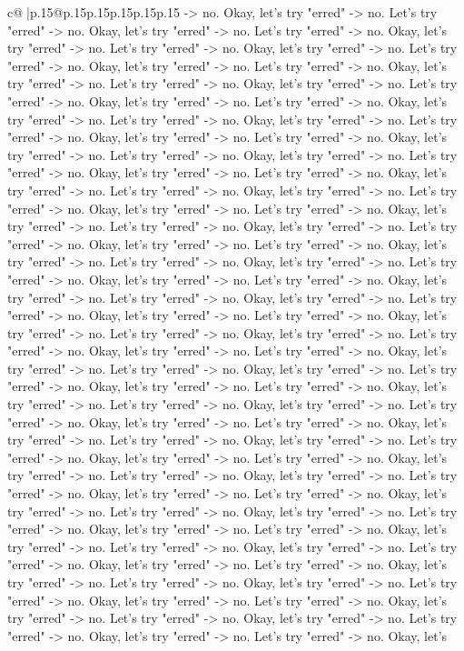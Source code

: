 \documentclass{article}
\begin{document}
{\begin{supertabular}{c@{$\;$}|p{.15\linewidth}@{}p{.15\linewidth}p{.15\linewidth}p{.15\linewidth}p{.15\linewidth}p{.15\linewidth}}
{{{{-}> no. Okay, let's try "erred" {-}> no. Let's try "erred" {-}> no. Okay, let's try "erred" {-}> no. Let's try "erred" {-}> no. Okay, let's try "erred" {-}> no. Let's try "erred" {-}> no. Okay, let's try "erred" {-}> no. Let's try "erred" {-}> no. Okay, let's try "erred" {-}> no. Let's try "erred" {-}> no. Okay, let's try "erred" {-}> no. Let's try "erred" {-}> no. Okay, let's try "erred" {-}> no. Let's try "erred" {-}> no. Okay, let's try "erred" {-}> no. Let's try "erred" {-}> no. Okay, let's try "erred" {-}> no. Let's try "erred" {-}> no. Okay, let's try "erred" {-}> no. Let's try "erred" {-}> no. Okay, let's try "erred" {-}> no. Let's try "erred" {-}> no. Okay, let's try "erred" {-}> no. Let's try "erred" {-}> no. Okay, let's try "erred" {-}> no. Let's try "erred" {-}> no. Okay, let's try "erred" {-}> no. Let's try "erred" {-}> no. Okay, let's try "erred" {-}> no. Let's try "erred" {-}> no. Okay, let's try "erred" {-}> no. Let's try "erred" {-}> no. Okay, let's try "erred" {-}> no. Let's try "erred" {-}> no. Okay, let's try "erred" {-}> no. Let's try "erred" {-}> no. Okay, let's try "erred" {-}> no. Let's try "erred" {-}> no. Okay, let's try "erred" {-}> no. Let's try "erred" {-}> no. Okay, let's try "erred" {-}> no. Let's try "erred" {-}> no. Okay, let's try "erred" {-}> no. Let's try "erred" {-}> no. Okay, let's try "erred" {-}> no. Let's try "erred" {-}> no. Okay, let's try "erred" {-}> no. Let's try "erred" {-}> no. Okay, let's try "erred" {-}> no. Let's try "erred" {-}> no. Okay, let's try "erred" {-}> no. Let's try "erred" {-}> no. Okay, let's try "erred" {-}> no. Let's try "erred" {-}> no. Okay, let's try "erred" {-}> no. Let's try "erred" {-}> no. Okay, let's try "erred" {-}> no. Let's try "erred" {-}> no. Okay, let's try "erred" {-}> no. Let's try "erred" {-}> no. Okay, let's try "erred" {-}> no. Let's try "erred" {-}> no. Okay, let's try "erred" {-}> no. Let's try "erred" {-}> no. Okay, let's try "erred" {-}> no. Let's try "erred" {-}> no. Okay, let's try "erred" {-}> no. Let's try "erred" {-}> no. Okay, let's try "erred" {-}> no. Let's try "erred" {-}> no. Okay, let's try "erred" {-}> no. Let's try "erred" {-}> no. Okay, let's try "erred" {-}> no. Let's try "erred" {-}> no. Okay, let's try "erred" {-}> no. Let's try "erred" {-}> no. Okay, let's try "erred" {-}> no. Let's try "erred" {-}> no. Okay, let's try "erred" {-}> no. Let's try "erred" {-}> no. Okay, let's try "erred" {-}> no. Let's try "erred" {-}> no. Okay, let's try "erred" {-}> no. Let's try "erred" {-}> no. Okay, let's try "erred" {-}> no. Let's try "erred" {-}> no. Okay, let's try "erred" {-}> no. Let's try "erred" {-}> no. Okay, let's try "erred" {-}> no. Let's try "erred" {-}> no. Okay, let's try "erred" {-}> no. Let's try "erred" {-}> no. Okay, let's try "erred" {-}> no. Let's try "erred" {-}> no. Okay, let's try "erred" {-}> no. Let's try "erred" {-}> no. Okay, let's try "erred" {-}> no. Let's try "erred" {-}> no. Okay, let's try "erred" {-}> no. Let's try "erred" {-}> no. Okay, let's try "erred" {-}> no. Let's try "erred" {-}> no. Okay, let's try "erred" {-}> no. Let's try "erred" {-}> no. Okay, let's try "erred" {-}> no. Let's try "erred" {-}> no. Okay, let's }}}
\end{supertabular}}
\end{document}
